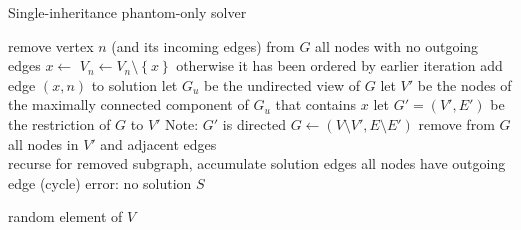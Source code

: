 \begin{algorithm} 
  \caption{Single-inheritance phantom-only solver}
  \label{hiercomp/alg:single:simple}
  \hrulefill

  \begin{algorithmic}[1]
    \State \Return {}
    \EndFunction
  \end{algorithmic}

  \hrulefill

  \begin{algorithmic}[1]
       \State remove vertex $n$ (and its incoming edges) from $G$ 
        \Comment all nodes with no outgoing edges
          \State $x \gets$ 
          \State $V_n \gets V_n \setminus \left\{x\right\}$ 
           \Comment otherwise it has been ordered by earlier iteration
              \Comment add edge $(x,n)$ to solution
             \State let $G_u$ be the undirected view of $G$ 
             \State let $V'$ be the nodes of the maximally connected 
               component of $G_u$ that contains $x$
             \State let $G' = (V',E')$ be the restriction of $G$ to $V'$ \Comment Note: $G'$ is directed
             \State $G \gets (V \setminus V', E \setminus E')$ \Comment remove from $G$ all nodes in $V'$ and adjacent edges
              \\
                               \Comment recurse for removed subgraph, accumulate solution edges
          \EndIf
       \EndWhile
        \Comment all nodes have outgoing edge (cycle)
         \State error: no solution  \label{hiercomp/lst:line:cycle}  %
       \EndIf
       \State \Return $S$
    \EndFunction
  \end{algorithmic}

  \hrulefill

  \begin{algorithmic}[1]
    \State \Return random element of $V$
    \EndFunction
  \end{algorithmic}
\end{algorithm} 


